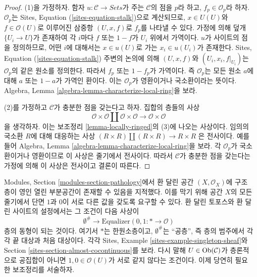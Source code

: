 \begin{proof}
(1)을 가정하자. 함자 $u : \mathcal{C} \to \textit{Sets}$가 주는
$\mathcal{C}$의 점을 $p$라 하고, $f_p \in \mathcal{O}_p$라 하자.
$\mathcal{O}_p$는 Sites, Equation (\ref{sites-equation-stalk})으로
계산되므로, $x \in U(U)$와 $f \in \mathcal{O}(U)$로 이루어진 삼중항
$(U, x, f)$로 $f_p$를 나타낼 수 있다. 가정에 의해 덮개
$\{U_i \to U\}$가 존재하여 각 $i$마다 $f$ 또는 $1 - f$가 $U_i$ 위에서
가역이다. $u$가 사이트의 점을 정의하므로, 어떤 $i$에 대해서는
$x \in u(U)$로 가는 $x_i \in u(U_i)$가 존재한다.
Sites, Equation (\ref{sites-equation-stalk}) 주변의 논의에 의해
$(U, x, f)$와 $(U_i, x_i, f|_{U_i})$는 $\mathcal{O}_p$의 같은 원소를
정의한다. 따라서 $f_p$ 또는 $1 - f_p$가 가역이다. 즉
$\mathcal{O}_p$는 모든 원소 $a$에 대해 $a$ 또는 $1 - a$가 가역인 환이다.
이는 $\mathcal{O}_p$가 영환이거나 국소환이라는 뜻이다.
Algebra, Lemma \ref{algebra-lemma-characterize-local-ring}을 보라.

\medskip\noindent
(2)를 가정하고 $\mathcal{C}$가 충분한 점을 갖는다고 하자.
집합의 층들의 사상
$$
\mathcal{O} \times \mathcal{O} \amalg \mathcal{O} \times \mathcal{O}
\longrightarrow
\mathcal{O} \times \mathcal{O}
$$
을 생각하자. 이는 보조정리 \ref{lemma-locally-ringed}의 (3)에 나오는
사상이다. 임의의 국소환 $R$에 대해 대응하는 사상
$(R \times R) \amalg (R \times R) \to R \times R$
은 전사이다. 예를 들어 Algebra, Lemma
\ref{algebra-lemma-characterize-local-ring}을 보라.
각 $\mathcal{O}_p$가 국소환이거나 영환이므로 이 사상은 줄기에서 전사이다.
따라서 $\mathcal{C}$가 충분한 점을 갖는다는 가정에 의해 이 사상은
전사이고 결론이 따른다.
\end{proof}

\noindent
Modules, Section \ref{modules-section-pathology}에서 환 달린 공간
$(X, \mathcal{O}_X)$에 구조층이 영인 열린 부분공간이 존재할 수 있음을
지적했다. 이를 막기 위해 공간 $X$의 모든 줄기에서 단면 $1$과 $0$이
서로 다른 값을 갖도록 요구할 수 있다. 환 달린 토포스와 환 달린 사이트의
설정에서는 그 조건이 다음 사상이
\begin{equation}
\label{equation-one-is-never-zero}
\emptyset^\# \longrightarrow
\text{Equalizer}(0, 1 : * \longrightarrow \mathcal{O})
\end{equation}
층의 동형이 되는 것이다. 여기서 $*$는 한원소층이고,
$\emptyset^\#$는 ``공층'', 즉 층의 범주에서 각각 끝 대상과 처음 대상이다.
각각 Sites, Example \ref{sites-example-singleton-sheaf}와
Section \ref{sites-section-almost-cocontinuous}를 보라.
다시 말해 $U \in \mathop{\mathrm{Ob}}\nolimits(\mathcal{C})$가 층론적으로 공집합이 아니면
$1, 0 \in \mathcal{O}(U)$가 서로 같지 않다는 조건이다.
이제 당연히 필요한 보조정리를 서술하자.

